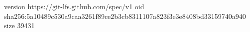 version https://git-lfs.github.com/spec/v1
oid sha256:5a10489c530a9caa3261f89ce2b3cb8311107a823f3e3e8408bd33159740a940
size 39431
